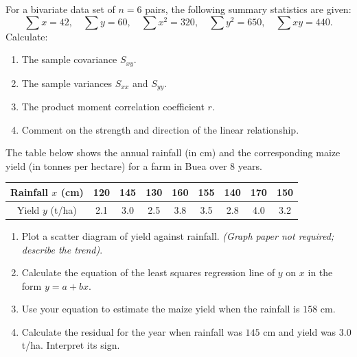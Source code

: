 \documentclass[11pt]{article}
\newcounter{popsec}
\newcounter{popsub}
\newcommand{\courssub}[1]{%
  \stepcounter{popsub}%
  \par\vspace{9pt}\noindent{\popxbold\fontsize{11.5}{13}\selectfont\color{popink}{\color{poporange}\thepopsec.\thepopsub}\hspace{6pt}#1}\par\nopagebreak\vspace{4pt}
}
\begin{document}
\begin{exercice}
For a bivariate data set of $n=6$ pairs, the following summary statistics are given:
\[
\sum x = 42,\quad \sum y = 60,\quad \sum x^2 = 320,\quad \sum y^2 = 650,\quad \sum xy = 440.
\]
Calculate:
\begin{enumerate}
    \item The sample covariance $S_{xy}$.
    \item The sample variances $S_{xx}$ and $S_{yy}$.
    \item The product moment correlation coefficient $r$.
    \item Comment on the strength and direction of the linear relationship.
\end{enumerate}
\end{exercice}

\courssub{I practise}

\begin{exercice}
The table below shows the annual rainfall (in cm) and the corresponding maize yield (in tonnes per hectare) for a farm in Buea over 8 years.

\begin{center}
\begin{tabular}{|c|c|c|c|c|c|c|c|c|}
\hline
Rainfall $x$ (cm) & 120 & 145 & 130 & 160 & 155 & 140 & 170 & 150 \\
\hline
Yield $y$ (t/ha) & 2.1 & 3.0 & 2.5 & 3.8 & 3.5 & 2.8 & 4.0 & 3.2 \\
\hline
\end{tabular}
\end{center}

\begin{enumerate}
    \item Plot a scatter diagram of yield against rainfall. \emph{(Graph paper not required; describe the trend)}.
    \item Calculate the equation of the least squares regression line of $y$ on $x$ in the form $y = a + bx$.
    \item Use your equation to estimate the maize yield when the rainfall is $158$ cm.
    \item Calculate the residual for the year when rainfall was $145$ cm and yield was $3.0$ t/ha. Interpret its sign.
\end{enumerate}
\end{exercice}
\end{document}
